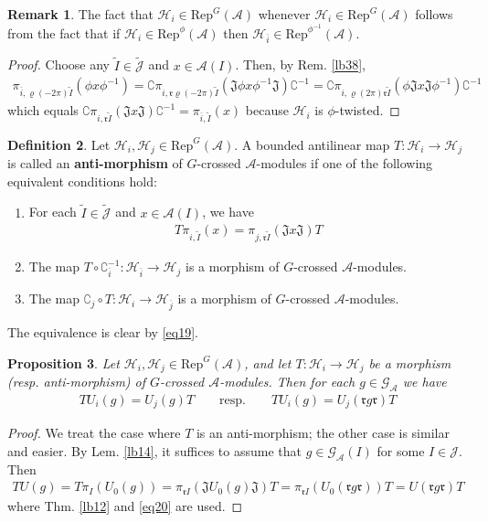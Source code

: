 \documentclass[11pt,b5paper,notitlepage]{article}
\theoremstyle{definition}
\newtheorem{df}{Definition}[section]
\newtheorem{rem}[df]{Remark}
\theoremstyle{plain}
\newtheorem{pp}[df]{Proposition}
\newcommand{\fk}{\mathfrak}
\newcommand{\wtd}{\widetilde}
\newcommand{\ovl}{\overline}
\newcommand{\Rep}{\mathrm{Rep}}
\newcommand{\RepGA}{\mathrm{Rep}^G(\mathcal A)}
\newcommand{\GA}{\mathscr G_{\mathcal A}}
\newcommand{\Jtd}{\widetilde{\mathcal J}}
\newcommand{\Co}{\complement}
\newcommand{\rk}{\mathfrak r}
\newcommand{\MA}{\mathcal A}
\newcommand{\MH}{\mathcal H}
\newcommand{\MJ}{\mathcal J}
\numberwithin{equation}{section}
\begin{document}
\begin{rem}
The fact that $\MH_i\in\RepGA$ whenever $\MH_i\in\RepGA$ follows from the fact that if $\MH_i\in\Rep^\phi(\MA)$ then $\MH_{\ovl i}\in\Rep^{\phi^{-1}}(\MA)$.
\end{rem}


\begin{proof}
Choose any $\wtd I\in\Jtd$ and $x\in\MA(I)$. Then, by Rem. \ref{lb38},
\begin{align*}
\pi_{\ovl i,\varrho(-2\pi)\wtd I}(\phi x\phi^{-1})=\Co\pi_{i,\rk\varrho(-2\pi)\wtd I}(\fk J\phi x\phi^{-1}\fk J)\Co^{-1}=\Co\pi_{i,\varrho(2\pi)\rk\wtd I}(\phi\fk J x\fk J\phi^{-1})\Co^{-1}
\end{align*}
which equals $\Co\pi_{i,\rk\wtd I}(\fk Jx\fk J)\Co^{-1}=\pi_{\ovl i,\wtd I}(x)$ because $\MH_i$ is $\phi$-twisted.
\end{proof}

\begin{df}\label{lb82}
Let $\MH_i,\MH_j\in\RepGA$. A bounded antilinear map $T:\MH_i\rightarrow\MH_j$ is called an \textbf{anti-morphism} of $G$-crossed $\MA$-modules if one of the following equivalent conditions hold:
\begin{enumerate}[label=(\arabic*)]
\item For each $\wtd I\in\Jtd$ and $x\in\MA(I)$, we have
\begin{align*}
T\pi_{i,\wtd I}(x)=\pi_{j,\rk\wtd I}(\fk Jx\fk J)T
\end{align*}
\item The map $T\circ\Co_{\ovl i}^{-1}:\MH_{\ovl i}\rightarrow\MH_j$ is a morphism of $G$-crossed $\MA$-modules.
\item The map $\Co_j\circ T:\MH_i\rightarrow\MH_{\ovl j}$ is a morphism of $G$-crossed $\MA$-modules.
\end{enumerate}
The equivalence is clear by \eqref{eq19}.
\end{df}

\begin{pp}\label{lb42}
Let $\MH_i,\MH_j\in\RepGA$, and let $T:\MH_i\rightarrow\MH_j$ be a morphism (resp. anti-morphism) of $G$-crossed $\MA$-modules. Then for each $g\in\GA$ we have
\begin{align}
TU_i(g)=U_j(g)T\qquad\text{resp.}\qquad TU_i(g)=U_j(\rk g\rk)T
\end{align}  
\end{pp}


\begin{proof}
We treat the case where $T$ is an anti-morphism; the other case is similar and easier. By Lem. \ref{lb14}, it suffices to assume that $g\in\GA(I)$ for some $I\in\MJ$. Then
\begin{align*}
TU(g)=T\pi_I(U_0(g))=\pi_{\rk I}(\fk JU_0(g)\fk J)T=\pi_{\rk I}(U_0(\rk g\rk))T=U(\rk g\rk)T
\end{align*}
where Thm. \ref{lb12} and \eqref{eq20} are used.
\end{proof}
\end{document}
